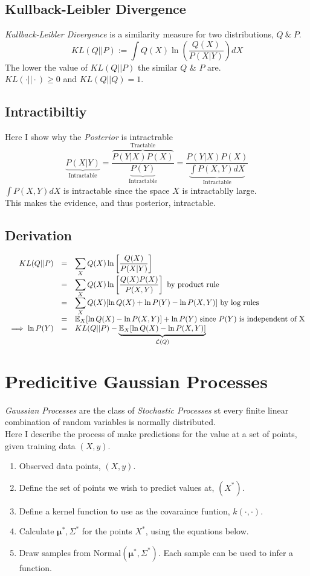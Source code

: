 \documentclass[11pt,a4paper]{article}
\begin{document}
\subsection{Kullback-Leibler Divergence}
\textit{Kullback-Leibler Divergence} is a similarity measure for two distributions, $Q\ \&\ P$.
$$KL(Q||P):=\int Q(X)\ln\left(\frac{Q(X)}{P(X|Y)}\right)dX$$
The lower the value of $KL(Q||P)$ the similar $Q$ \& $P$ are.\\
\nb $KL(\cdot||\cdot)\geq 0$ and $KL(Q||Q)=1$.

\subsection{Intractibiltiy}
Here I show why the \textit{Posterior} is intractrable
$$\underbrace{P(X|Y)}_\text{Intractable}=\frac{\overbrace{P(Y|X)P(X)}^\text{Tractable}}{\underbrace{P(Y)}_\text{Intractable}}=\frac{P(Y|X)P(X)}{\underbrace{\int P(X,Y)dX}_\text{Intractable}}$$
$\int P(X,Y)dX$ is intractable since the space $X$ is intractablly large.\\
This makes the evidence, and thus posterior, intractable.

\subsection{Derivation}
\[\begin{array}{rcl}
KL(Q||P)&=&\displaystyle\sum_X Q(X)\ln\left[\dfrac{Q(X)}{P(X|Y)}\right]\\
&=&\displaystyle\sum_X Q(X)\ln\left[\dfrac{Q(X)P(X)}{P(X,Y)}\right]\text{ by product rule}\\
&=&\displaystyle\sum_XQ(X)[\ln Q(X)+\ln P(Y)-\ln P(X,Y)]\text{ by log rules}\\
&=&\mathbb{E}_X[\ln Q(X)-\ln P(X,Y)]+\ln P(Y)\text{ since }P(Y)\text{ is independent of X}\\
\implies\ln P(Y)&=&KL(Q||P)-\underbrace{\mathbb{E}_X[\ln Q(X)-\ln P(X,Y)]}_{\mathcal{L}(Q)}
\end{array}\]

\section{Predicitive Gaussian Processes}
\textit{Gaussian Processes} are the class of \textit{Stochastic Processes} st every finite linear combination of random variables is normally distributed.\\
Here I describe the process of make predictions for the value at a set of points, given training data $(X,y)$.
\begin{enumerate}
	\item Observed data points, $(X,y)$.
	\item Define the set of points we wish to predict values at, $(X^*)$.
	\item Define a kernel function to use as the covaraince funtion, $k(\cdot,\cdot)$.
	\item Calculate $\pmb\mu^*,\Sigma^*$ for the points $X^*$, using the equations below.
	\item Draw samples from $\text{Normal}(\pmb\mu^*,\Sigma^*)$. Each sample can be used to infer a function.
\end{enumerate}
\end{document}
